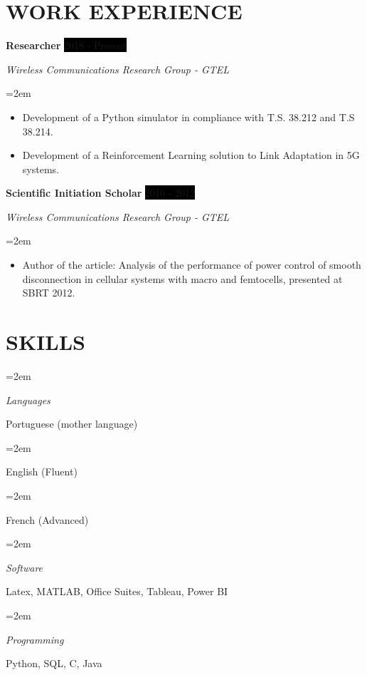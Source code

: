 \documentclass[paper=a4,fontsize=11pt]{scrartcl} %
\newlength{\spacebox}
\newcommand{\sepspace}{\vspace*{1em}}		%
\newcommand{\NewPart}[1]{\section*{\uppercase{#1}}}
\newcommand{\PersonalEntry}[2]{
		\noindent\hangindent=2em\hangafter=0 %
		\parbox{\spacebox}{        %
		\textit{#1}}		       %
		\hspace{1.5em} #2 \par}    %
\newcommand{\SkillsEntry}[2]{      %
		\noindent\hangindent=2em\hangafter=0 %
		\parbox{\spacebox}{        %
		\textit{#1}}			   %
		\hspace{1.5em} #2 \par}    %
\newcommand{\EducationEntry}[5]{
		\noindent \textbf{#4} \hfill      %
		\colorbox{Black}{%
			\parbox{5cm}{%
			\hfill\color{White}#3}} \par  %
		\noindent \textit{#1}, #2 \par        %
		\noindent\hangindent=2em\hangafter=0 \small {#5} %
		\normalsize \par}
\newcommand{\WorkEntry}[4]{				  %
		\noindent \textbf{#1} \hfill      %
		\noindent\colorbox{Black}{\color{White}#2} \par  %
		\noindent \textit{#3} \par              %
		\noindent\hangindent=2em\hangafter=0 \small #4 %
		\normalsize \par}
\begin{document}
\NewPart{Work Experience}{}

\WorkEntry{Researcher}{2018 - Present}{Wireless Communications Research Group - GTEL}{
\begin{itemize}
    \item Development of a Python simulator in compliance with T.S. 38.212 and T.S 38.214.
    \item Development of a Reinforcement Learning solution to Link Adaptation in 5G systems.
\end{itemize}
}

\sepspace

\WorkEntry{Scientific Initiation Scholar}{2010 - 2012}{Wireless Communications Research Group - GTEL}{
\begin{itemize}
    \item Author of the article: Analysis of the performance of power control of smooth disconnection in cellular systems with macro and femtocells, presented at SBRT 2012.
\end{itemize}
}


\NewPart{Skills}{}

\SkillsEntry{Languages}{Portuguese (mother language)}
\SkillsEntry{}{English (Fluent)}
\SkillsEntry{}{French (Advanced)}

\SkillsEntry{Software}{Latex, MATLAB, Office Suites, Tableau, Power BI}
\SkillsEntry{Programming}{Python, SQL, C, Java}


\end{document}
